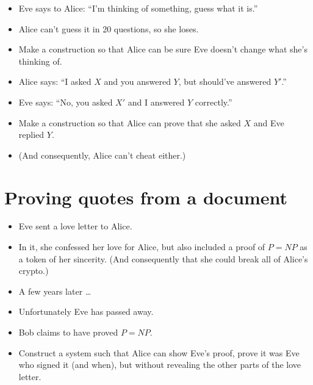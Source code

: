 \begin{frame}
  \begin{exercise}
    \begin{itemize}
      \item Eve says to Alice: \enquote{I'm thinking of something, guess what 
        it is.}
      \item Alice can't guess it in 20 questions, so she loses.
      \item Make a construction so that Alice can be sure Eve doesn't change 
        what she's thinking of.
    \end{itemize}
  \end{exercise}

  \begin{exercise}
    \begin{itemize}
      \item Alice says: \enquote{I asked \(X\) and you answered \(Y\),
        but should've answered \(Y'\).}
      \item Eve says: \enquote{No, you asked \(X'\) and I answered \(Y\) 
        correctly.}
      \item Make a construction so that Alice can prove that she asked \(X\) 
        and Eve replied \(Y\).
      \item (And consequently, Alice can't cheat either.)
    \end{itemize}
  \end{exercise}
\end{frame}

\section{Proving quotes from a document}

\begin{frame}
  \begin{exercise}
    \begin{itemize}
      \item Eve sent a love letter to Alice.
      \item In it, she confessed her love for Alice, but also included a proof 
        of \(P = NP\) as a token of her sincerity. (And consequently that she 
        could break all of Alice's crypto.)

        \pause

      \item A few years later \dots
      \item Unfortunately Eve has passed away.
      \item Bob claims to have proved \(P = NP\).
      \item Construct a system such that Alice can show Eve's proof, prove it 
        was Eve who signed it (and when), but without revealing the other parts 
        of the love letter.
    \end{itemize}
  \end{exercise}
\end{frame}

